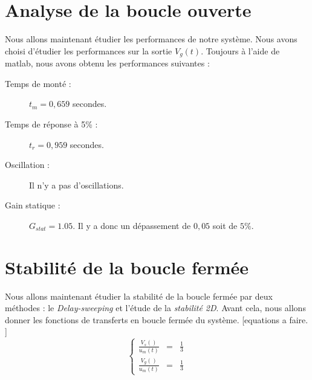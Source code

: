	\section{Analyse de la boucle ouverte}
Nous allons maintenant étudier les performances de notre système. Nous avons choisi d'étudier les performances sur la sortie $V_g(t)$. 
Toujours à l'aide de matlab, nous avons obtenu les performances suivantes : 
\begin{description}
\item[Temps de monté :] $t_m = 0,659 $ secondes.
\item[Temps de réponse à 5\% :] $t_r = 0,959$ secondes.
\item[Oscillation :] Il n'y a pas d'oscillations.
\item[Gain statique :] $G_{stat}= 1.05$. Il y a donc un dépassement de $0,05$ soit de $5\%$.	
\end{description}	
	\section{Stabilité de la boucle fermée}
Nous allons maintenant étudier la stabilité de la boucle fermée par deux méthodes : le \emph{Delay-sweeping} et l'étude de la \emph{stabilité 2D}. Avant cela, nous allons donner les fonctions de transferts en boucle fermée du système. 
[equations a faire. ]
\begin{equation}
\left\lbrace
\begin{array}{lcl}
\frac{V_s()}{u_m(t)}	&=&	\frac{1}{3}\\
\frac{V_g()}{u_m(t)}	&=&	\frac{1}{3}
\end{array}
\right.
\end{equation}

